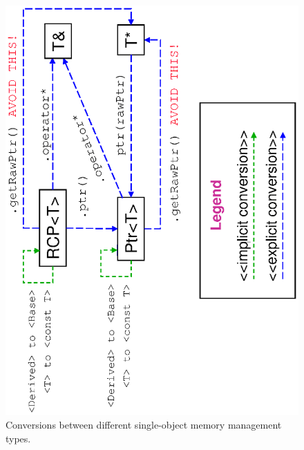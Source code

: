 \documentclass[pdf,ps2pdf,11pt]{SANDreport}
\begin{document}
{\bsinglespace
\begin{figure}[p]
\begin{center}
\includegraphics*[angle=270,scale=0.50]{TeuchosPtrConversions}
\end{center}
\caption{
\label{fig:TeuchosPtrConversions}
Conversions between different single-object memory management types.}
\end{figure}
\esinglespace}
\end{document}
